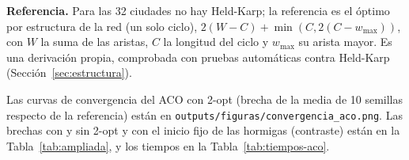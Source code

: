 \documentclass[12pt,a4paper]{article}
\begin{document}
\textbf{Referencia.} Para las 32
ciudades no hay Held-Karp; la referencia es el óptimo por estructura de la red
(un solo ciclo), $2(W - C) + \min(C, 2(C - w_{\max}))$, con $W$ la suma de las
aristas, $C$ la longitud del ciclo y $w_{\max}$ su arista mayor. Es una
derivación propia, comprobada con pruebas automáticas contra Held-Karp
(Sección~\ref{sec:estructura}).

\begin{table}[H]
\centering
\caption{Validación del agente: ACO con 2-opt y 10 semillas por instancia.
Referencia: Held-Karp ($n \le 20$) u óptimo por estructura ($n = 32$). Inst.:
instancias del grupo; Br. mejor, máx.: mayor brecha de la mejor corrida;
Igualan: semillas que alcanzan la referencia; tiempos medios}
\label{tab:val-resumen}
\scriptsize\setlength{\tabcolsep}{3pt}


\end{table}

Las curvas de convergencia del ACO con 2-opt (brecha de la media de 10
semillas respecto de la referencia) están en
\texttt{outputs/figuras/convergencia\_aco.png}. Las brechas con y sin 2-opt y con el
inicio fijo de las hormigas (contraste) están en la
Tabla~\ref{tab:ampliada}, y los tiempos en la Tabla~\ref{tab:tiempos-aco}.

\begin{table}[!htbp]
\centering
\caption{Brecha media (\%) del ACO respecto de la referencia y semillas que la igualan, con 2-opt, sin 2-opt (inicio aleatorio) y sin 2-opt con inicio fijo. Fuente: elaboración propia}
\label{tab:ampliada}
\scriptsize\setlength{\tabcolsep}{3pt}

\end{table}

\begin{table}[!htbp]
\centering
\caption{Tiempo y memoria de Held-Karp y del ACO por tamaño de instancia. Fuente: elaboración propia}
\label{tab:tiempos-aco}
\small

\end{table}
\end{document}
